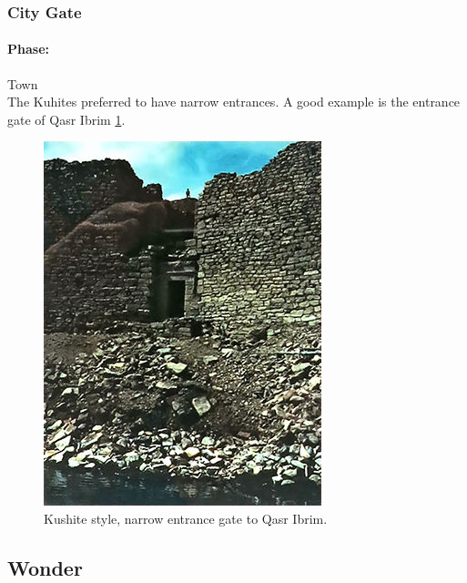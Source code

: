 \documentclass[a4paper,12pt]{scrreprt}
\begin{document}
\subsubsection{City Gate}

\paragraph{Phase:} Town\\

The Kuhites preferred to have narrow entrances. A good example is the entrance gate of Qasr Ibrim \ref{fig:city_gate}.

\begin{figure}[H]
	\centering
	\includegraphics[width=\textwidth]{img/walls_gates/qasr_ibrim_gate}
	\caption{Kushite style, narrow entrance gate to Qasr Ibrim.}\label{fig:city_gate}
\end{figure}

\subsection{Wonder}
\end{document}
